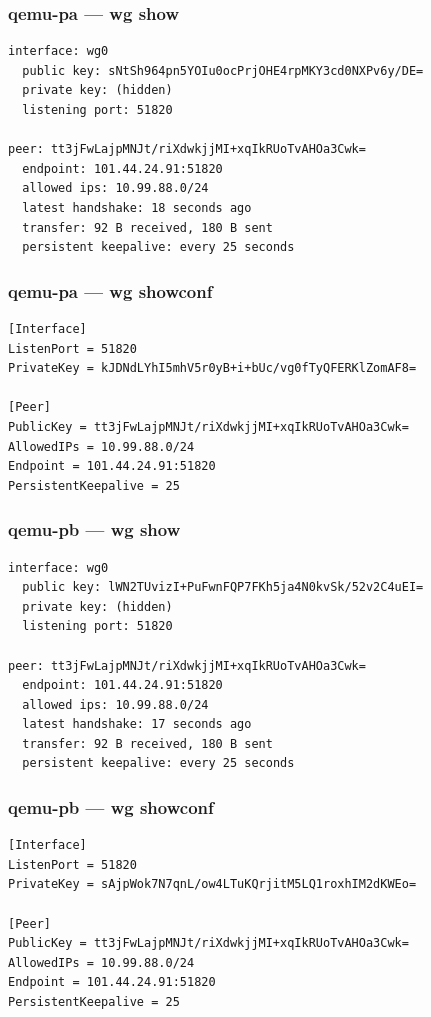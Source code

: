 \documentclass[11pt,a4paper]{article}
\begin{document}
\subsubsection*{qemu-pa — wg show}
\begin{lstlisting}
interface: wg0
  public key: sNtSh964pn5YOIu0ocPrjOHE4rpMKY3cd0NXPv6y/DE=
  private key: (hidden)
  listening port: 51820

peer: tt3jFwLajpMNJt/riXdwkjjMI+xqIkRUoTvAHOa3Cwk=
  endpoint: 101.44.24.91:51820
  allowed ips: 10.99.88.0/24
  latest handshake: 18 seconds ago
  transfer: 92 B received, 180 B sent
  persistent keepalive: every 25 seconds

\end{lstlisting}

\subsubsection*{qemu-pa — wg showconf}
\begin{lstlisting}
[Interface]
ListenPort = 51820
PrivateKey = kJDNdLYhI5mhV5r0yB+i+bUc/vg0fTyQFERKlZomAF8=

[Peer]
PublicKey = tt3jFwLajpMNJt/riXdwkjjMI+xqIkRUoTvAHOa3Cwk=
AllowedIPs = 10.99.88.0/24
Endpoint = 101.44.24.91:51820
PersistentKeepalive = 25

\end{lstlisting}

\subsubsection*{qemu-pb — wg show}
\begin{lstlisting}
interface: wg0
  public key: lWN2TUvizI+PuFwnFQP7FKh5ja4N0kvSk/52v2C4uEI=
  private key: (hidden)
  listening port: 51820

peer: tt3jFwLajpMNJt/riXdwkjjMI+xqIkRUoTvAHOa3Cwk=
  endpoint: 101.44.24.91:51820
  allowed ips: 10.99.88.0/24
  latest handshake: 17 seconds ago
  transfer: 92 B received, 180 B sent
  persistent keepalive: every 25 seconds

\end{lstlisting}

\subsubsection*{qemu-pb — wg showconf}
\begin{lstlisting}
[Interface]
ListenPort = 51820
PrivateKey = sAjpWok7N7qnL/ow4LTuKQrjitM5LQ1roxhIM2dKWEo=

[Peer]
PublicKey = tt3jFwLajpMNJt/riXdwkjjMI+xqIkRUoTvAHOa3Cwk=
AllowedIPs = 10.99.88.0/24
Endpoint = 101.44.24.91:51820
PersistentKeepalive = 25

\end{lstlisting}
\end{document}

